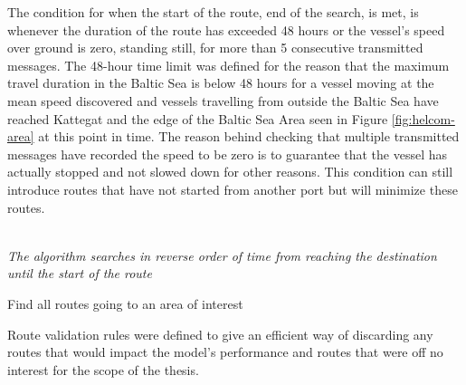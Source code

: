 \documentclass[../main.tex]{subfiles}
\begin{document}
The condition for when the start of the route, end of the search, is met, is whenever the duration of the route has exceeded 48 hours or the vessel's speed over ground is zero, standing still, for more than 5 consecutive transmitted messages. The 48-hour time limit was defined for the reason that the maximum travel duration in the Baltic Sea is below 48 hours for a vessel moving at the mean speed discovered and vessels travelling from outside the Baltic Sea have reached Kattegat and the edge of the Baltic Sea Area seen in Figure \ref{fig:helcom-area} at this point in time. The reason behind checking that multiple transmitted messages have recorded the speed to be zero is to guarantee that the vessel has actually stopped and not slowed down for other reasons. This condition can still introduce routes that have not started from another port but will minimize these routes.
\\\\
\begin{algorithm}[H]
\SetAlgoNoLine
\SetAlgoNoEnd

\emph{The algorithm searches in reverse order of time from reaching the destination until the start of the route}\;
\BlankLine
{}
\caption{Find all routes going to an area of interest}
\label{alg:search}
\end{algorithm}
\vspace*{5mm}

Route validation rules were defined to give an efficient way of discarding any routes that would impact the model's performance and routes that were off no interest for the scope of the thesis.
\end{document}
